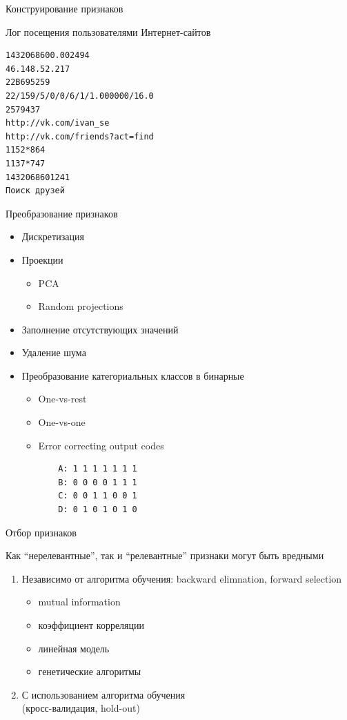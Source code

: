 \documentclass[aspectratio=169]{beamer}
\begin{document}
\begin{frame}[fragile]{Конструирование признаков}

Лог посещения пользователями Интернет-сайтов
\begin{verbatim}
1432068600.002494
46.148.52.217
22B695259
22/159/5/0/0/6/1/1.000000/16.0
2579437
http://vk.com/ivan_se
http://vk.com/friends?act=find
1152*864 
1137*747
1432068601241
Поиск друзей
\end{verbatim}

\end{frame}

\begin{frame}[fragile]{Преобразование признаков}

\begin{itemize}
\item Дискретизация
\item Проекции
	\begin{itemize}
	\item PCA
	\item Random projections
	\end{itemize}
\item Заполнение отсутствующих значений
\item Удаление шума
\item Преобразование категориальных классов в бинарные
	\begin{itemize}
	\item One-vs-rest
	\item One-vs-one
	\item Error correcting output codes
	\begin{verbatim}
	A: 1 1 1 1 1 1 1
	B: 0 0 0 0 1 1 1
	C: 0 0 1 1 0 0 1
	D: 0 1 0 1 0 1 0
	\end{verbatim}
	\end{itemize}
\end{itemize}

\end{frame}

\begin{frame}{Отбор признаков}

Как ``нерелевантные'', так и ``релевантные'' признаки могут быть вредными

\begin{enumerate}
\item Независимо от алгоритма обучения: backward elimnation, forward selection
	\begin{itemize}	
	\item mutual information	
	\item коэффициент корреляции
	\item линейная модель
	\item генетические алгоритмы
	\end{itemize}
\item С использованием алгоритма обучения \\ (кросс-валидация, hold-out)
\end{enumerate}

\end{frame}
\end{document}
